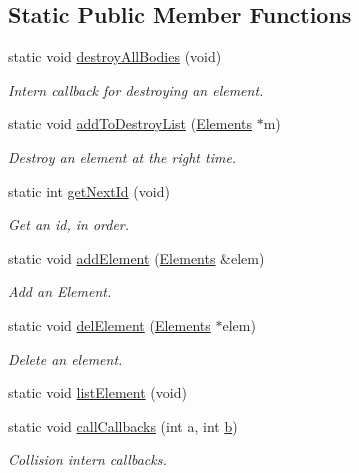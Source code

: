 \subsection*{Static Public Member Functions}
\begin{DoxyCompactItemize}
\item 
static void \hyperlink{class_game_ae391a35eb1f970669b0d6b236de4b885}{destroy\-All\-Bodies} (void)
\begin{DoxyCompactList}\small\item\em Intern callback for destroying an element. \end{DoxyCompactList}\item 
static void \hyperlink{class_game_ae3c5dc329506d37d244ef3587ac813af}{add\-To\-Destroy\-List} (\hyperlink{class_elements}{Elements} $\ast$m)
\begin{DoxyCompactList}\small\item\em Destroy an element at the right time. \end{DoxyCompactList}\item 
static int \hyperlink{class_game_aec4cafc10218eb665d67bf027ddbd3f1}{get\-Next\-Id} (void)
\begin{DoxyCompactList}\small\item\em Get an id, in order. \end{DoxyCompactList}\item 
static void \hyperlink{class_game_a10d84bf0157d5b3abf102846d5170af5}{add\-Element} (\hyperlink{class_elements}{Elements} \&elem)
\begin{DoxyCompactList}\small\item\em Add an Element. \end{DoxyCompactList}\item 
static void \hyperlink{class_game_a644e15f76310ed410817e8423ad7a5b2}{del\-Element} (\hyperlink{class_elements}{Elements} $\ast$elem)
\begin{DoxyCompactList}\small\item\em Delete an element. \end{DoxyCompactList}\item 
static void \hyperlink{class_game_aafc84f0b25d07825f08dffc07af73918}{list\-Element} (void)
\item 
static void \hyperlink{class_game_a34c8791251f785d270f757b6eff4ea56}{call\-Callbacks} (int a, int \hyperlink{jquery_8js_a2fa551895933fae935a0a6b87282241d}{b})
\begin{DoxyCompactList}\small\item\em Collision intern callbacks. \end{DoxyCompactList}\item 

\end{DoxyCompactItemize}
